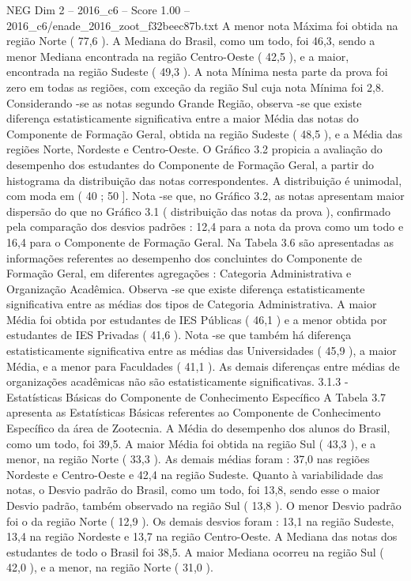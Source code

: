\begin{textsample}{NEG Dim 2 – 2016\_c6 – Score 1.00 – 2016\_c6/enade\_2016\_zoot\_f32beec87b.txt}
A menor nota Máxima foi obtida na região Norte ( 77,6 ).
A Mediana do Brasil, como um todo, foi 46,3, sendo a menor Mediana encontrada na região Centro-Oeste ( 42,5 ), e a maior, encontrada na região Sudeste ( 49,3 ).
A nota Mínima nesta parte da prova foi zero em todas as regiões, com exceção da região Sul cuja nota Mínima foi 2,8.
Considerando -se as notas segundo Grande Região, observa -se que existe diferença estatisticamente significativa entre a maior Média das notas do Componente de Formação Geral, obtida na região Sudeste ( 48,5 ), e a Média das regiões Norte, Nordeste e Centro-Oeste.
O Gráfico 3.2 propicia a avaliação do desempenho dos estudantes do Componente de Formação Geral, a partir do histograma da distribuição das notas correspondentes.
A distribuição é unimodal, com moda em ( 40 ; 50 ].
Nota -se que, no Gráfico 3.2, as notas apresentam maior dispersão do que no Gráfico 3.1 ( distribuição das notas da prova ), confirmado pela comparação dos desvios padrões : 12,4 para a nota da prova como um todo e 16,4 para o Componente de Formação Geral.
Na Tabela 3.6 são apresentadas as informações referentes ao desempenho dos concluintes do Componente de Formação Geral, em diferentes agregações : Categoria Administrativa e Organização Acadêmica.
Observa -se que existe diferença estatisticamente significativa entre as médias dos tipos de Categoria Administrativa.
A maior Média foi obtida por estudantes de IES Públicas ( 46,1 ) e a menor obtida por estudantes de IES Privadas ( 41,6 ).
Nota -se que também há diferença estatisticamente significativa entre as médias das Universidades ( 45,9 ), a maior Média, e a menor para Faculdades ( 41,1 ).
As demais diferenças entre médias de organizações acadêmicas não são estatisticamente significativas. 3.1.3 - Estatísticas Básicas do Componente de Conhecimento Específico A Tabela 3.7 apresenta as Estatísticas Básicas referentes ao Componente de Conhecimento Específico da área de Zootecnia.
A Média do desempenho dos alunos do Brasil, como um todo, foi 39,5.
A maior Média foi obtida na região Sul ( 43,3 ), e a menor, na região Norte ( 33,3 ).
As demais médias foram : 37,0 nas regiões Nordeste e Centro-Oeste e 42,4 na região Sudeste.
Quanto à variabilidade das notas, o Desvio padrão do Brasil, como um todo, foi 13,8, sendo esse o maior Desvio padrão, também observado na região Sul ( 13,8 ).
O menor Desvio padrão foi o da região Norte ( 12,9 ).
Os demais desvios foram : 13,1 na região Sudeste, 13,4 na região Nordeste e 13,7 na região Centro-Oeste.
A Mediana das notas dos estudantes de todo o Brasil foi 38,5.
A maior Mediana ocorreu na região Sul ( 42,0 ), e a menor, na região Norte ( 31,0 ).

\end{textsample}
